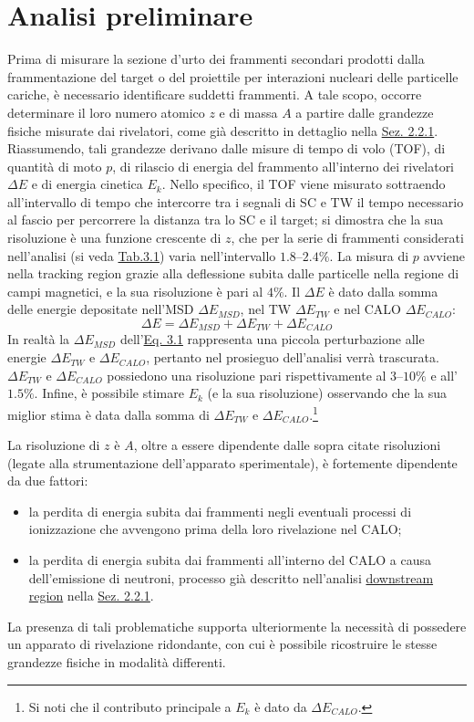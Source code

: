 \documentclass[12pt,a4paper,twoside]{report}
\begin{document}
	\section{Analisi preliminare}\label{sec:fragment_identification}
	Prima di misurare la sezione d'urto dei frammenti secondari prodotti dalla frammentazione del target o del proiettile per interazioni nucleari delle particelle cariche, è necessario identificare suddetti frammenti. A tale scopo, occorre determinare il loro numero atomico $z$ e di massa $A$ a partire dalle grandezze fisiche misurate dai rivelatori, come già descritto in dettaglio nella \hyperref[sec:setupElettronico]{Sez. 2.2.1}. Riassumendo, tali grandezze derivano dalle misure di tempo di volo (TOF), di quantità di moto $p$, di rilascio di energia del frammento all'interno dei rivelatori $\Delta E$ e di energia cinetica $E_k$. Nello specifico, il TOF viene misurato sottraendo all'intervallo di tempo che intercorre tra i segnali di SC e TW il tempo necessario al fascio per percorrere la distanza tra lo SC e il target; si dimostra che la sua risoluzione è una funzione crescente di $z$, che per la serie di frammenti considerati nell'analisi (si veda \hyperref[tab:fragments]{Tab.3.1}) varia nell'intervallo $1.8$--$2.4\%$. La misura di $p$ avviene nella tracking region grazie alla deflessione subita dalle particelle nella regione di campi magnetici, e la sua risoluzione è pari al $4\%$. Il $\Delta E$ è dato dalla somma delle energie depositate nell'MSD $\Delta E_{MSD}$, nel TW $\Delta E_{TW}$ e nel CALO $\Delta E_{CALO}$:
	\begin{equation}
		\Delta E=\Delta E_{MSD}+\Delta E_{TW}+\Delta E_{CALO}
		\label{eq:deposited_energy}
	\end{equation}
	In realtà la $\Delta E_{MSD}$ dell'\hyperref[eq:deposited_energy]{Eq. 3.1} rappresenta una piccola perturbazione alle energie $\Delta E_{TW}$ e $\Delta E_{CALO}$, pertanto nel prosieguo dell'analisi verrà trascurata. $\Delta E_{TW}$ e $\Delta E_{CALO}$ possiedono una risoluzione pari rispettivamente al $3$--$10\%$ e all'$1.5\%$. Infine, è possibile stimare $E_k$ (e la sua risoluzione) osservando che la sua miglior stima è data dalla somma di $\Delta E_{TW}$ e $\Delta E_{CALO}$.\footnote{Si noti che il contributo principale a $E_k$ è dato da $\Delta E_{CALO}$.}
	
	La risoluzione di $z$ è $A$, oltre a essere dipendente dalle sopra citate risoluzioni (legate alla strumentazione dell'apparato sperimentale), è fortemente dipendente da due fattori:
	\begin{itemize}
		\item la perdita di energia subita dai frammenti negli eventuali processi di ionizzazione che avvengono prima della loro rivelazione nel CALO;
		\item la perdita di energia subita dai frammenti all'interno del CALO a causa dell'emissione di neutroni, processo già descritto nell'analisi \hyperref[par:downstream_region]{downstream region} nella \hyperref[sec:setupElettronico]{Sez. 2.2.1}.
	\end{itemize}
	La presenza di tali problematiche supporta ulteriormente la necessità di possedere un apparato di rivelazione ridondante, con cui è possibile ricostruire le stesse grandezze fisiche in modalità differenti.
	
\end{document}
